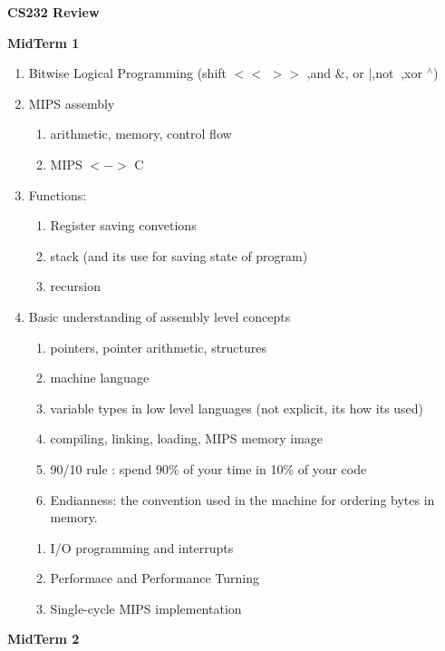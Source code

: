 \documentclass[12pt]{article}
\renewcommand{\=}[1]{\stackrel{#1}{=}} %
\theoremstyle{definition}
\theoremstyle{remark}
\begin{document}
\begin{center}
  {\LARGE
    \textbf{CS232 Review}\\
    \normalsize
  }
\end{center}
  \textbf{MidTerm 1}  
  \begin{enumerate}
  \item Bitwise Logical Programming (shift $<<$ $>>$ ,and $\&$, or
    $|$,not $~$,xor $^\wedge$)
  \item MIPS assembly
    \begin{enumerate}
    \item arithmetic, memory, control flow
    \item MIPS $<->$ C
    \end{enumerate}
  \item Functions:
    \begin{enumerate}
    \item Register saving convetions
    \item stack (and its use for saving state of program)
    \item recursion
    \end{enumerate}
  \item Basic understanding of assembly level concepts
    \begin{enumerate}
    \item pointers, pointer arithmetic, structures
    \item machine language
    \item variable types in low level languages (not explicit, its how
      its used)
    \item compiling, linking, loading, MIPS memory image
    \item 90/10 rule : spend 90\% of your time in 10\% of your code
    \item Endianness: the convention used in the machine for ordering
      bytes in memory.
    \end{enumerate}
    \begin{enumerate}
    \item I/O programming and interrupts
    \item Performace and Performance Turning
    \item Single-cycle MIPS implementation
    \end{enumerate}
  \end{enumerate}
  \textbf{MidTerm 2}
\end{document}
